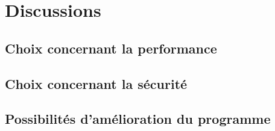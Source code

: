 \section{Discussions}
\subsection{Choix concernant la performance}
\subsection{Choix concernant la sécurité}
\subsection{Possibilités d'amélioration du programme}